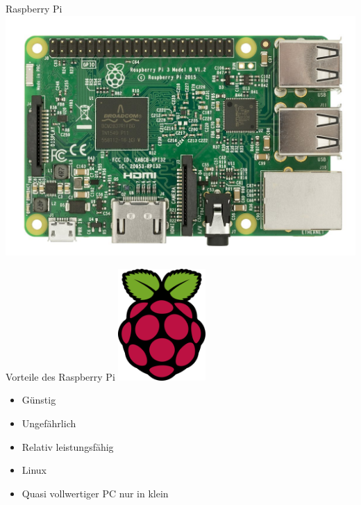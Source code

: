 \documentclass[utf8]{beamer}
\begin{document}
	\begin{frame}{Raspberry Pi}
		\centering\includegraphics[width=\textwidth]{img/1200px-Raspberry-Pi-3-Flat-Top.jpg}
		
	\end{frame}
	
	\begin{frame}{Vorteile des Raspberry Pi}
		\centering\includegraphics[width=0.25\textwidth]{img/Raspberry_Pi_Logo.png}
		\begin{itemize}
			\item Günstig
			\item Ungefährlich
			\item Relativ leistungsfähig
			\item Linux
			\item Quasi vollwertiger PC nur in klein
		\end{itemize}
	\end{frame}
	
	
	
	
	
\end{document}
